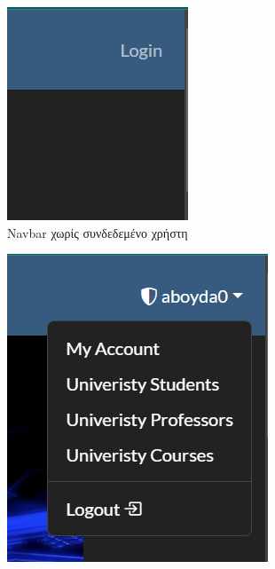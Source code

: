 \documentclass[12pt]{article}
\begin{document}
	\begin{figure}[H]
		\centering
		\begin{subfigure}{.22\textwidth}
			\centering
			\includegraphics[width=.75\linewidth]{b0.png}
			\caption{Navbar χωρίς συνδεδεμένο χρήστη}
			\label{fig:sub21}
		\end{subfigure}%
		\begin{subfigure}{.22\textwidth}
			\centering
			\includegraphics[width=.8\linewidth]{b1.png}

\end{subfigure}
\end{figure}
\end{document}
